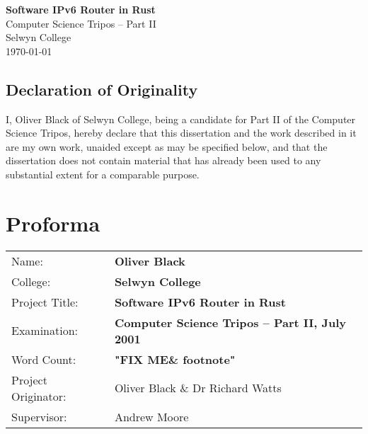 \documentclass[12pt,a4paper,twoside,openright]{report}
\begin{document}





\pagestyle{empty}



\vspace*{60mm}
\begin{center}
\Huge
\textbf{Software IPv6 Router in Rust} \\[5mm]
Computer Science Tripos -- Part II \\[5mm]
Selwyn College \\[5mm]
\today  %
\end{center}

\newpage
{}
\section*{Declaration of Originality}

I, Oliver Black of Selwyn College, being a candidate for Part II of 
the Computer Science Tripos, hereby declare
that this dissertation and the work described in it are my own work,
unaided except as may be specified below, and that the dissertation
does not contain material that has already been used to any substantial
extent for a comparable purpose.

\bigskip
{}

\medskip
{}


\pagestyle{plain}

\chapter*{Proforma}

{\large
\begin{tabular}{ll}
Name:               & \bf Oliver Black                      \\
College:            & \bf Selwyn College                     \\
Project Title:      & \bf Software IPv6 Router in Rust \\
Examination:        & \bf Computer Science Tripos -- Part II, July 2001  \\
Word Count:         & \bf "FIX ME\& footnote" \footnotemark[1]
                       \\
Project Originator: & Oliver Black \& Dr Richard Watts      \\
Supervisor:         & Andrew Moore                   \\ 
\end{tabular}
}
\end{document}

